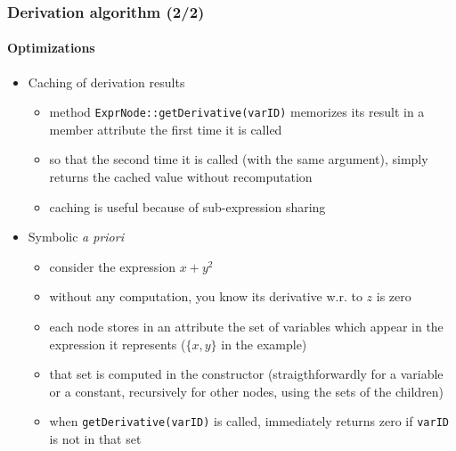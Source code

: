 \documentclass{beamer}
\begin{document}
\begin{frame}
  \frametitle{Derivation algorithm (2/2)}
  \framesubtitle{Optimizations}
  \begin{itemize}
  \item Caching of derivation results
    \begin{itemize}
    \item method \texttt{ExprNode::getDerivative(varID)} memorizes its result in a member attribute the first time it is called
    \item so that the second time it is called (with the same argument), simply returns the cached value without recomputation
    \item caching is useful because of sub-expression sharing
    \end{itemize}
    \pause
  \item Symbolic \textit{a priori}
    \begin{itemize}
    \item consider the expression $x+y^2$
    \item without any computation, you know its derivative w.r. to $z$ is zero
    \item each node stores in an attribute the set of variables which appear in the expression it represents ($\{x,y\}$ in the example)
    \item that set is computed in the constructor (straigthforwardly for a variable or a constant, recursively for other nodes, using the sets of the children)
    \item when \texttt{getDerivative(varID)} is called, immediately returns zero if \texttt{varID} is not in that set
    \end{itemize}
  \end{itemize}
\end{frame}
\end{document}
